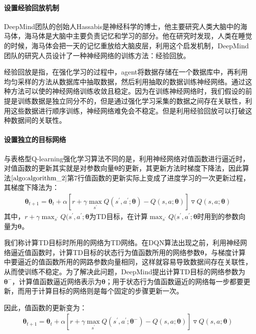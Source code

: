  \paragraph{设置经验回放机制}
DeepMind团队的创始人Hassabis是神经科学的博士，他主要研究人类大脑中的海马体，海马体是大脑中主要负责记忆和学习的部分。他在研究时发现，人类在睡觉的时候，海马体会把一天的记忆重放给大脑皮层，利用这个启发机制，DeepMind团队的研究人员设计了一种神经网络的训练方法：经验回放。

经验回放是指，在强化学习的过程中，agent将数据存储在一个数据库中，再利用均匀采样的方法从数据库中抽取数据，然后利用抽取的数据训练神经网络。通过这种方法可以使的神经网络训练收敛且稳定。因为在训练神经网络时，我们假设的前提是训练数据是独立同分不的，但是通过强化学习采集的数据之间存在关联性，利用这些数据进行顺序训练，神经网络难免会不稳定。但是利用经验回放可以打破这种数据间的关联性。

 \paragraph{设置独立的目标网络}
与表格型Q-learning强化学习算法不同的是，利用神经网络对值函数进行逼近时，对值函数的更新其实就是对参数向量$\mathbf{\theta}$的更新，其更新方法时梯度下降法，因此算法$\ref{algo:algorithm_2}$第7行值函数的更新实际上变成了进度学习的一次更新过程，其梯度下降法为：
\begin{displaymath}
\begin{aligned}
\mathbf{\theta}_{t+1}=\mathbf{\theta}_{t}+\alpha[r+\gamma \max_{s^{'}}Q(s^{'},a^{'};\mathbf{\theta})-Q(s,a;\mathbf{\theta})]\triangledown Q(s,a;\mathbf{\theta})
\end{aligned}
\end{displaymath}
其中，$r+\gamma \max_{s^{'}}Q(s^{'},a^{'};\mathbf{\theta}$为TD目标，在计算$\max_{s^{'}}Q(s^{'},a^{'};\mathbf{\theta}$时用到的参数向量为$\mathbf{\theta}$。

我们称计算TD目标时所用的网络为TD网络。在DQN算法出现之前，利用神经网络逼近值函数时，计算TD目标的状态行为值函数所用的网络参数$\mathbf{\theta}$，与梯度计算中要逼近的值函数所用的网路参数向量相同，这样就容易导致数据间存在关联性，从而使训练不稳定。为了解决此问题，DeepMind提出计算TD目标的网络参数为$\mathbf{\theta}^{-}$，计算值函数逼近网络表示为$\mathbf{\theta}$；用于状态行为值函数逼近的网络每一步都要更新，而用于计算目标的网络则是每个固定的步骤更新一次。

因此，值函数的更新变为：
\begin{displaymath}
\begin{aligned}
\mathbf{\theta}_{t+1}=\mathbf{\theta}_{t}+\alpha[r+\gamma \max_{s^{'}}Q(s^{'},a^{'};\mathbf{\theta^{-}})-Q(s,a;\mathbf{\theta})]\triangledown Q(s,a;\mathbf{\theta})
\end{aligned}
\end{displaymath}


